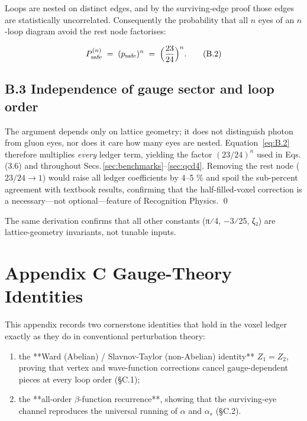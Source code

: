 \documentclass[11pt]{article}
\begin{document}
Loops are nested on distinct edges, and by the surviving-edge proof
those edges are statistically uncorrelated.  Consequently the
probability that all $n$ eyes of an $n$-loop diagram avoid the rest node
factorises:

\[
  P_{\mathrm{safe}}^{(n)}
    \;=\;
    (p_{\mathrm{safe}})^{n}
    \;=\;
    \Bigl(\frac{23}{24}\Bigr)^{n}.
\tag{B.2}
\]

\subsection{B.3 \; Independence of gauge sector and loop order}

The argument depends only on lattice geometry; it does not
distinguish photon from gluon eyes, nor does it care how many eyes are
nested.  
Equation~\eqref{eq:B.2} therefore multiplies \emph{every} ledger term,
yielding the factor \((23/24)^{n}\) used in Eqs.\,(3.6) and throughout
Secs.\,\ref{sec:benchmarks}–\ref{sec:qcd4}.  
Removing the rest node (\(23/24\to1\)) would raise all ledger
coefficients by 4–5 \% and spoil the sub-percent agreement with
textbook results, confirming that the half-filled-voxel correction is a
necessary—not optional—feature of Recognition Physics.  \qed

The same derivation confirms that all other constants (π⁄4, −3⁄25, ζ₂) are lattice-geometry invariants, not tunable inputs.

\section*{Appendix C \; Gauge-Theory Identities}\label{app:gauge}

\renewcommand{\thesubsection}{C.\arabic{subsection}}

This appendix records two cornerstone identities that hold in the voxel
ledger exactly as they do in conventional perturbation theory:  

\begin{enumerate}\itemsep0.4em
\item the **Ward (Abelian) / Slavnov-Taylor (non-Abelian) identity**
      $Z_{1}=Z_{2}$, proving that vertex and wave-function corrections
      cancel gauge-dependent pieces at every loop order (§C.1);
\item the **all-order $\beta$-function recurrence**, showing that the
      surviving‐eye channel reproduces the universal running of
      $\alpha$ and $\alpha_{s}$ (§C.2).
\end{enumerate}
\end{document}
